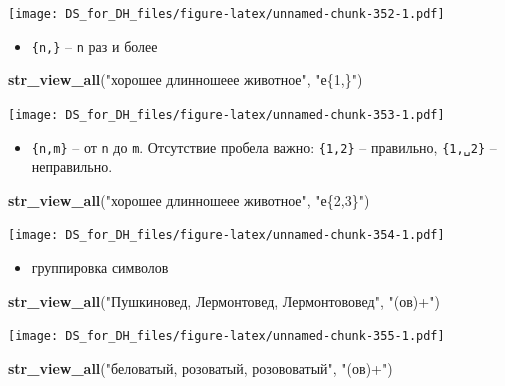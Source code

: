 \documentclass[
]{book}
\newenvironment{Shaded}{\begin{snugshade}}{\end{snugshade}}
\newcommand{\KeywordTok}[1]{\textcolor[rgb]{0.13,0.29,0.53}{\textbf{#1}}}
\newcommand{\NormalTok}[1]{#1}
\newcommand{\StringTok}[1]{\textcolor[rgb]{0.31,0.60,0.02}{#1}}
\providecommand{\tightlist}{%
  \setlength{\itemsep}{0pt}\setlength{\parskip}{0pt}}
\begin{document}
\texttt{[image: DS\_for\_DH\_files/figure-latex/unnamed-chunk-352-1.pdf]}

\begin{itemize}
\tightlist
\item
  \texttt{\{n,\}} -- \texttt{n} раз и более
\end{itemize}

\begin{Shaded}
\begin{Highlighting}[]
\KeywordTok{str_view_all}\NormalTok{(}\StringTok{"хорошее длинношеее животное"}\NormalTok{, }\StringTok{"е\{1,\}"}\NormalTok{)}
\end{Highlighting}
\end{Shaded}

\texttt{[image: DS\_for\_DH\_files/figure-latex/unnamed-chunk-353-1.pdf]}

\begin{itemize}
\tightlist
\item
  \texttt{\{n,m\}} -- от \texttt{n} до \texttt{m}. Отсутствие пробела важно: \texttt{\{1,2\}} -- правильно, \texttt{\{1,␣2\}} -- неправильно.
\end{itemize}

\begin{Shaded}
\begin{Highlighting}[]
\KeywordTok{str_view_all}\NormalTok{(}\StringTok{"хорошее длинношеее животное"}\NormalTok{, }\StringTok{"е\{2,3\}"}\NormalTok{)}
\end{Highlighting}
\end{Shaded}

\texttt{[image: DS\_for\_DH\_files/figure-latex/unnamed-chunk-354-1.pdf]}

\begin{itemize}
\tightlist
\item
  группировка символов
\end{itemize}

\begin{Shaded}
\begin{Highlighting}[]
\KeywordTok{str_view_all}\NormalTok{(}\StringTok{"Пушкиновед, Лермонтовед, Лермонтововед"}\NormalTok{, }\StringTok{"(ов)+"}\NormalTok{)}
\end{Highlighting}
\end{Shaded}

\texttt{[image: DS\_for\_DH\_files/figure-latex/unnamed-chunk-355-1.pdf]}

\begin{Shaded}
\begin{Highlighting}[]
\KeywordTok{str_view_all}\NormalTok{(}\StringTok{"беловатый, розоватый, розововатый"}\NormalTok{, }\StringTok{"(ов)+"}\NormalTok{)}
\end{Highlighting}
\end{Shaded}
\end{document}
